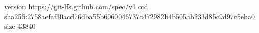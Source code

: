 version https://git-lfs.github.com/spec/v1
oid sha256:2758aefaf30acd76dba55b6060046737c472982b4b505ab233d85c9d97c5eba0
size 43840
